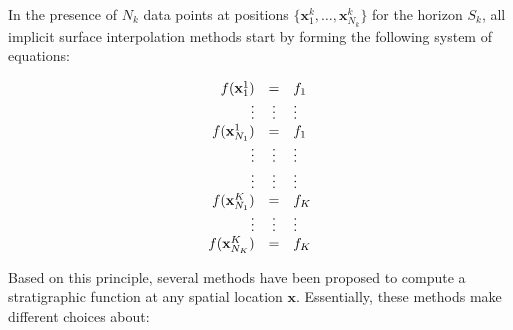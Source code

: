 \documentclass[final]{ring20}
\begin{document}
In the presence of $N_k$ data points at positions $\{\mathbf{x}_1^k, \ldots, \mathbf{x}_{N_k}^k\}$ for the horizon $S_k$, all implicit surface interpolation methods start by forming the following system of equations: 

\begin{equation}
\label{eq:datasystem}
\begin{array}{r c l}
f(\mathbf{x}_1^1) & = & f_1 \\
\vdots & \vdots & \vdots \\
f(\mathbf{x}_{N_1}^1) & = & f_1 \\
\vdots & \vdots & \vdots \\
\vdots & \vdots & \vdots \\
f(\mathbf{x}_{N_1}^K) & = & f_K \\
\vdots & \vdots & \vdots \\
f(\mathbf{x}_{N_K}^K) & = & f_K \\
\end{array}
\end{equation}

Based on this principle, several methods have been proposed to compute a stratigraphic function at any spatial location $\mathbf{x}$. Essentially, these methods make different choices about:
 
\end{document}
